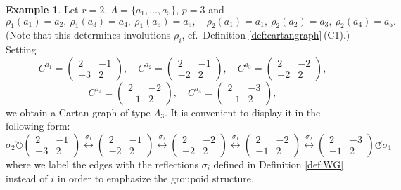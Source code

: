 \documentclass[11pt,a4paper]{amsart}
\theoremstyle{definition}
\newtheorem{Example}[Lemma]{Example}
\numberwithin{equation}{section}
\newcommand{\rfl }{\rho }
\begin{document}
\begin{Example}\label{ex:13122}
Let $r=2$, $A=\{a_1,\ldots,a_5\}$, 
$p=3$ and
$$\rfl_1(a_1)=a_2,\:
\rfl_1(a_3)=a_4,\:
\rfl_1(a_5) = a_5, \quad
\rfl_2(a_1)=a_1,\:
\rfl_2(a_2)=a_3,\:
\rfl_2(a_4)=a_5.$$
(Note that this determines involutions  
$\rho_i$, cf.\ Definition \ref{def:cartangraph}\,(C1).)
Setting
$$
C^{a_1} = \begin{pmatrix} 2 & -1 \\ -3 & 2 \end{pmatrix}, \quad
C^{a_2} = \begin{pmatrix} 2 & -1 \\ -2 & 2 \end{pmatrix}, \quad
C^{a_3} = \begin{pmatrix} 2 & -2 \\ -2 & 2 \end{pmatrix}, $$
$$
C^{a_4} = \begin{pmatrix} 2 & -2 \\ -1 & 2 \end{pmatrix}, \quad
C^{a_5} = \begin{pmatrix} 2 & -3 \\ -1 & 2 \end{pmatrix}, $$
we obtain a Cartan graph of type $\Lambda_3$. It is convenient to display it in the following form:
$$
\sigma_2 \circlearrowright
\begin{pmatrix} 2 & -1 \\ -3 & 2 \end{pmatrix}
\stackrel{\sigma_1}{\longleftrightarrow}
\begin{pmatrix} 2 & -1 \\ -2 & 2 \end{pmatrix}
\stackrel{\sigma_2}{\longleftrightarrow}
\begin{pmatrix} 2 & -2 \\ -2 & 2 \end{pmatrix}
\stackrel{\sigma_1}{\longleftrightarrow}
\begin{pmatrix} 2 & -2 \\ -1 & 2 \end{pmatrix}
\stackrel{\sigma_2}{\longleftrightarrow}
\begin{pmatrix} 2 & -3 \\ -1 & 2 \end{pmatrix}
\circlearrowleft \sigma_1
$$
where we label the edges with the reflections $\sigma_i$ defined in Definition \ref{def:WG} instead of $i$ in order to emphasize the groupoid structure.
\end{Example}
\end{document}
